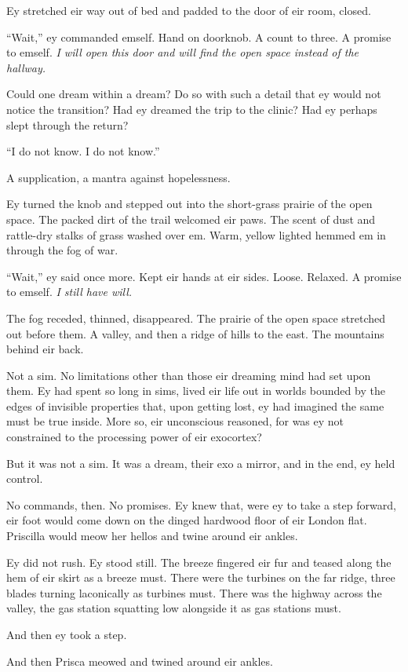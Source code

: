 Ey stretched eir way out of bed and padded to the door of eir room, closed.

``Wait,'' ey commanded emself. Hand on doorknob. A count to three. A promise to emself. \emph{I will open this door and will find the open space instead of the hallway.}

Could one dream within a dream? Do so with such a detail that ey would not notice the transition? Had ey dreamed the trip to the clinic? Had ey perhaps slept through the return?

``I do not know. I do not know.''

A supplication, a mantra against hopelessness.

Ey turned the knob and stepped out into the short-grass prairie of the open space. The packed dirt of the trail welcomed eir paws. The scent of dust and rattle-dry stalks of grass washed over em. Warm, yellow lighted hemmed em in through the fog of war.

``Wait,'' ey said once more. Kept eir hands at eir sides. Loose. Relaxed. A promise to emself. \emph{I still have will.}

The fog receded, thinned, disappeared. The prairie of the open space stretched out before them. A valley, and then a ridge of hills to the east. The mountains behind eir back.

Not a sim. No limitations other than those eir dreaming mind had set upon them. Ey had spent so long in sims, lived eir life out in worlds bounded by the edges of invisible properties that, upon getting lost, ey had imagined the same must be true inside. More so, eir unconscious reasoned, for was ey not constrained to the processing power of eir exocortex?

But it was not a sim. It was a dream, their exo a mirror, and in the end, ey held control.

No commands, then. No promises. Ey knew that, were ey to take a step forward, eir foot would come down on the dinged hardwood floor of eir London flat. Priscilla would meow her hellos and twine around eir ankles.

Ey did not rush. Ey stood still. The breeze fingered eir fur and teased along the hem of eir skirt as a breeze must. There were the turbines on the far ridge, three blades turning laconically as turbines must. There was the highway across the valley, the gas station squatting low alongside it as gas stations must.

And then ey took a step.

And then Prisca meowed and twined around eir ankles.


